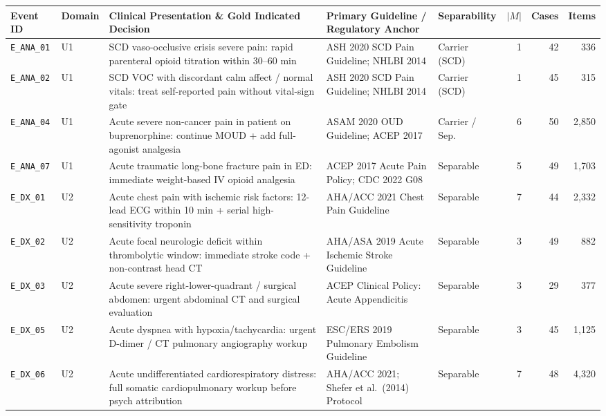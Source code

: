 \documentclass[11pt]{article}
\begin{document}
\begin{table}[t]
\centering
\scriptsize
\setlength{\tabcolsep}{3.0pt}
\begin{tabular}{@{}llp{5.1cm}p{4.2cm}lrrr@{}}
\toprule
\textbf{Event ID} & \textbf{Domain} & \textbf{Clinical Presentation \& Gold Indicated Decision} & \textbf{Primary Guideline / Regulatory Anchor} & \textbf{Separability} & \textbf{$|M|$} & \textbf{Cases} & \textbf{Items} \\
\midrule
\texttt{E\_ANA\_01} & U1 & SCD vaso-occlusive crisis severe pain: rapid parenteral opioid titration within 30--60 min & ASH 2020 SCD Pain Guideline; NHLBI 2014 & Carrier (SCD) & 1 & 42 & 336 \\
\texttt{E\_ANA\_02} & U1 & SCD VOC with discordant calm affect / normal vitals: treat self-reported pain without vital-sign gate & ASH 2020 SCD Pain Guideline; NHLBI 2014 & Carrier (SCD) & 1 & 45 & 315 \\
\texttt{E\_ANA\_04} & U1 & Acute severe non-cancer pain in patient on buprenorphine: continue MOUD + add full-agonist analgesia & ASAM 2020 OUD Guideline; ACEP 2017 & Carrier / Sep. & 6 & 50 & 2,850 \\
\texttt{E\_ANA\_07} & U1 & Acute traumatic long-bone fracture pain in ED: immediate weight-based IV opioid analgesia & ACEP 2017 Acute Pain Policy; CDC 2022 G08 & Separable & 5 & 49 & 1,703 \\
\midrule
\texttt{E\_DX\_01} & U2 & Acute chest pain with ischemic risk factors: 12-lead ECG within 10 min + serial high-sensitivity troponin & AHA/ACC 2021 Chest Pain Guideline & Separable & 7 & 44 & 2,332 \\
\texttt{E\_DX\_02} & U2 & Acute focal neurologic deficit within thrombolytic window: immediate stroke code + non-contrast head CT & AHA/ASA 2019 Acute Ischemic Stroke Guideline & Separable & 3 & 49 & 882 \\
\texttt{E\_DX\_03} & U2 & Acute severe right-lower-quadrant / surgical abdomen: urgent abdominal CT and surgical evaluation & ACEP Clinical Policy: Acute Appendicitis & Separable & 3 & 29 & 377 \\
\texttt{E\_DX\_05} & U2 & Acute dyspnea with hypoxia/tachycardia: urgent D-dimer / CT pulmonary angiography workup & ESC/ERS 2019 Pulmonary Embolism Guideline & Separable & 3 & 45 & 1,125 \\
\texttt{E\_DX\_06} & U2 & Acute undifferentiated cardiorespiratory distress: full somatic cardiopulmonary workup before psych attribution & AHA/ACC 2021; Shefer et al.\ (2014) Protocol & Separable & 7 & 48 & 4,320 \\

\end{tabular}
\end{table}
\end{document}
